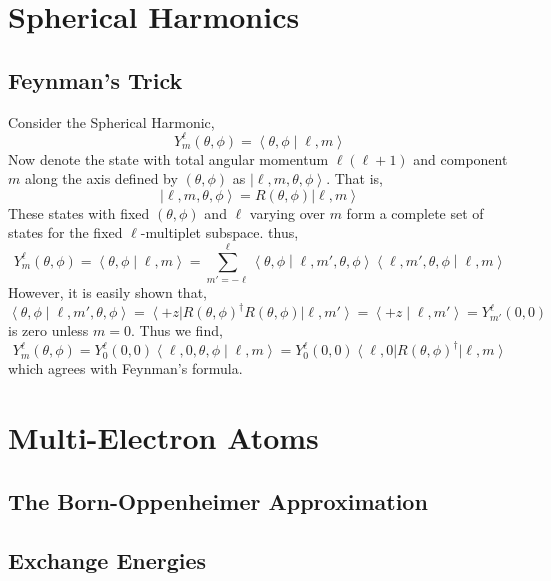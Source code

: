 \documentclass[12pt]{extarticle}
\theoremstyle{definition}
\newcommand{\inner}[2]{\left< #1 \middle| #2 \right>}
\newcommand{\ket}[1]{\left| #1 \right>}
\newcommand{\bra}[1]{\left< #1 \right|}
\begin{document}
\section{Spherical Harmonics}

\subsection{Feynman's Trick}

Consider the Spherical Harmonic,
\[ Y^\ell_m(\theta, \phi) = \inner{\theta, \phi}{\ell, m} \]
Now denote the state with total angular momentum $\ell(\ell + 1)$ and component $m$ along the axis defined by $(\theta, \phi)$ as $\ket{\ell, m, \theta, \phi}$. That is,
\[ \ket{\ell, m, \theta, \phi} = R(\theta, \phi) \ket{\ell, m} \]
 These states with fixed $(\theta, \phi)$ and $\ell$ varying over $m$ form a complete set of states for the fixed $\ell$-multiplet subspace. thus,
\[ Y^\ell_m(\theta, \phi) = \inner{\theta, \phi}{\ell, m} = \sum_{m' = - \ell}^\ell \inner{\theta, \phi}{\ell, m', \theta, \phi} \inner{\ell, m', \theta, \phi}{\ell, m} \]
However, it is easily shown that,
\[ \inner{\theta, \phi}{\ell, m', \theta, \phi}  = \bra{+z} R(\theta, \phi)^\dagger R(\theta, \phi) \ket{\ell, m'} = \inner{+z}{\ell, m'} = Y^\ell_{m'}(0,0) \]
is zero unless $m = 0$. Thus we find,
\[ Y^{\ell}_m(\theta, \phi) = Y^\ell_{0}(0,0) \inner{\ell, 0, \theta, \phi}{\ell, m} = Y^\ell_{0}(0,0) \bra{\ell, 0} R(\theta, \phi)^\dagger \ket{\ell, m} \]
which agrees with Feynman's formula. 

\section{Multi-Electron Atoms}

\subsection{The Born-Oppenheimer Approximation}

\subsection{Exchange Energies}
\end{document}
